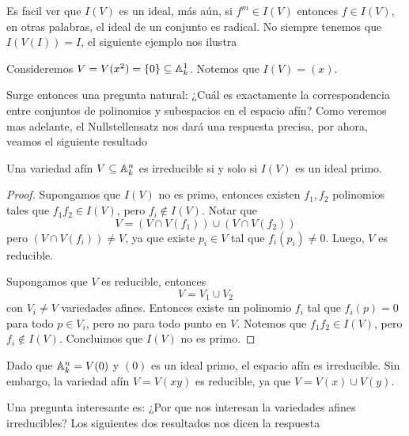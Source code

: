 \documentclass[11pt]{article}
\begin{document}
\noindent Es facil ver que $I(V)$ es un ideal, más aún, si $f^{m}\in I(V)$ entonces $f\in I(V)$, 
en otras palabras, el ideal de un conjunto es radical. No siempre tenemos que $I(V(I))=I$, el
siguiente ejemplo nos ilustra

\begin{ejm}
    Consideremos $V=V(x^{2})=\{0\}\subseteq\mathbb{A}_{k}^{1}$. Notemos que $I(V)=(x)$.
\end{ejm}

\noindent Surge entonces una pregunta natural: ¿Cuál es exactamente la correspondencia entre 
conjuntos de polinomios y subespacios en el espacio afín? Como veremos mas adelante, el 
Nullstellensatz nos dará una respuesta precisa, por ahora, veamos el siguiente resultado

\begin{prop}
    Una variedad afín $V\subseteq\mathbb{A}_{k}^{n}$ es irreducible si y solo si $I(V)$ es un ideal primo.
\end{prop}

\begin{proof}
    Supongamos que $I(V)$ no es primo, entonces existen $f_{1},f_{2}$ polinomios tales que 
    $f_{1}f_{2}\in I(V)$, pero $f_{i}\not\in I(V)$. Notar que
    \begin{equation*}
        V=(V\cap V(f_{1}))\cup(V\cap V(f_{2}))
    \end{equation*}
    pero $(V\cap V(f_{i}))\neq V$, ya que existe $p_{i}\in V$ tal que $f_{i}(p_{i})\neq0$. Luego, 
    $V$ es reducible.

    \vspace{1mm}
    Supongamos que $V$ es reducible, entonces
    \begin{equation*}
        V=V_{1}\cup V_{2}
    \end{equation*}
    con $V_{i}\neq V$ variedades afines. Entonces existe un polinomio $f_{i}$ tal que $f_{i}(p)=0$ 
    para todo $p\in V_{i}$, pero no para todo punto en $V$. Notemos que $f_{1}f_{2}\in I(V)$, pero 
    $f_{i}\not\in I(V)$. Concluimos que $I(V)$ no es primo.
\end{proof}

\begin{ejm}
    Dado que $\mathbb{A}_{k}^{n}=V(0)$ y $(0)$ es un ideal primo, el espacio afín es irreducible. Sin 
    embargo, la variedad afín $V=V(xy)$ es reducible, ya que $V=V(x)\cup V(y)$.
\end{ejm}

\noindent Una pregunta interesante es: ¿Por que nos interesan la variedades afines irreducibles? 
Los siguientes dos resultados nos dicen la respuesta
\end{document}

